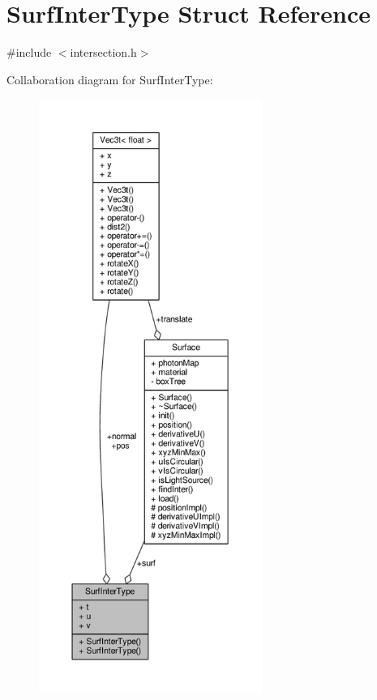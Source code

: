 \hypertarget{structSurfInterType}{}\section{Surf\+Inter\+Type Struct Reference}
\label{structSurfInterType}


{\ttfamily \#include $<$intersection.\+h$>$}



Collaboration diagram for Surf\+Inter\+Type\+:\nopagebreak
\begin{figure}[H]
\begin{center}
\leavevmode
\includegraphics[height=550pt]{structSurfInterType__coll__graph}
\end{center}
\end{figure}
